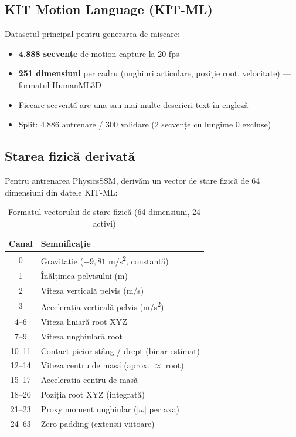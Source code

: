 \subsection{KIT Motion Language (KIT-ML)}

Datasetul principal pentru generarea de mișcare:
\begin{itemize}
    \item \textbf{4.888 secvențe} de motion capture la 20 fps \cite{plappert2016kit}
    \item \textbf{251 dimensiuni} per cadru (unghiuri articulare, poziție root, velocitate) --- formatul HumanML3D \cite{guo2022humanml3d}
    \item Fiecare secvență are una sau mai multe descrieri text în engleză
    \item Split: 4.886 antrenare / 300 validare (2 secvențe cu lungime 0 excluse)
\end{itemize}

\subsection{Starea fizică derivată}

Pentru antrenarea PhysicsSSM, derivăm un vector de stare fizică de 64 dimensiuni din datele KIT-ML:

\begin{table}[h]
\centering
\begin{tabular}{c l}
\hline
\textbf{Canal} & \textbf{Semnificație} \\
\hline
0       & Gravitație ($-9{,}81$ m/s\textsuperscript{2}, constantă) \\
1       & Înălțimea pelvisului (m) \\
2       & Viteza verticală pelvis (m/s) \\
3       & Accelerația verticală pelvis (m/s\textsuperscript{2}) \\
4--6    & Viteza liniară root XYZ \\
7--9    & Viteza unghiulară root \\
10--11  & Contact picior stâng / drept (binar estimat) \\
12--14  & Viteza centru de masă (aprox. $\approx$ root) \\
15--17  & Accelerația centru de masă \\
18--20  & Poziția root XYZ (integrată) \\
21--23  & Proxy moment unghiular ($|\omega|$ per axă) \\
24--63  & Zero-padding (extensii viitoare) \\
\hline
\end{tabular}
\caption{Formatul vectorului de stare fizică (64 dimensiuni, 24 activi)}
\label{tab:physics_state}
\end{table}

